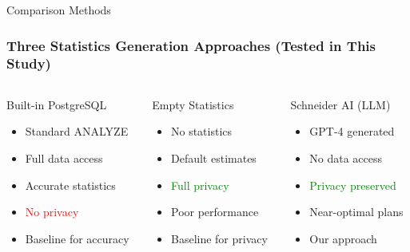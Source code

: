 \documentclass{beamer}
\begin{document}
\begin{frame}{Comparison Methods}
\frametitle{Three Statistics Generation Approaches (Tested in This Study)}

\begin{columns}[T]
\begin{column}{0.33\textwidth}
\begin{block}{Built-in PostgreSQL}
\begin{itemize}
    \item Standard ANALYZE
    \item Full data access
    \item Accurate statistics
    \item \textcolor{red}{No privacy}
    \item Baseline for accuracy
\end{itemize}
\end{block}
\end{column}

\begin{column}{0.33\textwidth}
\begin{block}{Empty Statistics}
\begin{itemize}
    \item No statistics
    \item Default estimates
    \item \textcolor{green}{Full privacy}
    \item Poor performance
    \item Baseline for privacy
\end{itemize}
\end{block}
\end{column}

\begin{column}{0.33\textwidth}
\begin{block}{Schneider AI (LLM)}
\begin{itemize}
    \item GPT-4 generated
    \item No data access
    \item \textcolor{green}{Privacy preserved}
    \item Near-optimal plans
    \item Our approach
\end{itemize}
\end{block}
\end{column}
\end{columns}

\vspace{0.5cm}


\end{frame}
\end{document}
